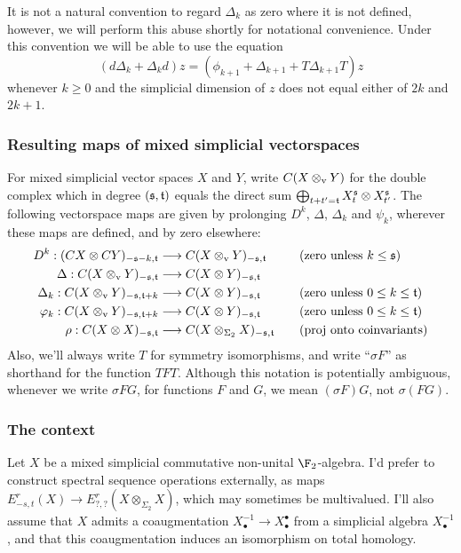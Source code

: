 \documentclass[10pt]{article}
\newcommand{\twist}{\sigma}
\begin{document}
\begin{AdamsSSEQ operations final}
It is not a natural convention to regard $\Delta_k$ as zero where it is not defined, however, we will perform this abuse shortly for notational convenience. Under this convention we will be able to use the equation
\[(d\Delta_k+\Delta_kd)z=(\phi_{k+1} +\Delta_{k+1}+T\Delta_{k+1}T)z\]
whenever $k\geq0$ and the simplicial dimension of $z$ does not equal either of $2k$ and $2k+1$.

\subsubsection*{Resulting maps of mixed simplicial vectorspaces}
For mixed simplicial vector spaces $X$ and $Y$, write $C(X\otimes_\textup{v}Y)$ for the double complex which in degree $(\mathfrak{s},\mathfrak{t})$ equals the direct sum $\bigoplus_{t+t'=\mathfrak{t}}X_t^{\mathfrak{s}}\otimes X_{t'}^{\mathfrak{s}}$. The following vectorspace maps are given by prolonging $D^k$, $\Delta$, $\Delta_k$ and $\psi_k$, wherever these maps are defined, and by zero elsewhere:
\begin{align*}
{D}^k:(CX\otimes CY)_{-\mathfrak{s}-k,\mathfrak{t}}&\longrightarrow C(X\otimes_\textup{v}Y)_{-\mathfrak{s},\mathfrak{t}}&\quad&\textup{(zero unless $k\leq \mathfrak{s}$)}\\
{\Delta}:C(X\otimes_\textup{v} Y)_{-\mathfrak{s},\mathfrak{t}}&\longrightarrow C(X\otimes Y)_{-\mathfrak{s},\mathfrak{t}}\\
{\Delta}_k:C(X\otimes_\textup{v} Y)_{-\mathfrak{s},\mathfrak{t}+k}&\longrightarrow C(X\otimes Y)_{-\mathfrak{s},\mathfrak{t}}&\quad&\textup{(zero unless $0\leq k\leq \mathfrak{t}$)}\\
{\varphi}_k:C(X\otimes_\textup{v} Y)_{-\mathfrak{s},\mathfrak{t}+k}&\longrightarrow C(X\otimes Y)_{-\mathfrak{s},\mathfrak{t}}&\quad&\textup{(zero unless $0\leq k\leq \mathfrak{t}$)}\\
{\rho}:C(X\otimes X)_{-\mathfrak{s},\mathfrak{t}}&\longrightarrow C(X\otimes_{\Sigma_2} X)_{-\mathfrak{s},\mathfrak{t}}&\quad&\textup{(proj onto coinvariants)}
\end{align*}
Also, we'll always write $T$ for symmetry isomorphisms, and write ``$\twist F$'' as shorthand for the function $TFT$. Although this notation is potentially ambiguous, whenever we write $\sigma FG$, for functions $F$ and $G$, we mean $(\sigma F)G$, not $\sigma(FG)$.

\subsubsection*{The context}
Let $X$ be a mixed simplicial commutative non-unital $\F_2$-algebra. I'd prefer to construct spectral sequence operations externally, as maps $E^r_{-s,t}(X)\to E^r_{?,?}(X\otimes_{\Sigma_2}X)$, which may sometimes be multivalued. I'll also assume that $X$ admits a coaugmentation $X^{-1}_\bullet\to X^\bullet_\bullet$ from a simplicial algebra $X^{-1}_\bullet$, and that this coaugmentation induces an isomorphism on total homology.


\end{AdamsSSEQ operations final}
\end{document}
